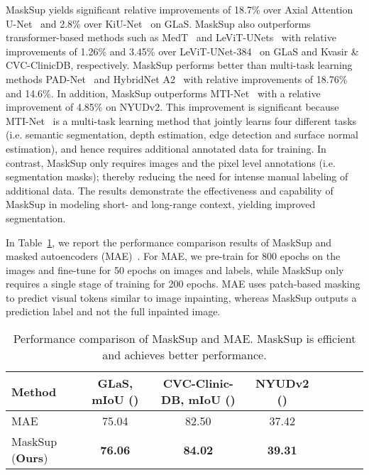 \documentclass{bmvc2k}
\begin{document}
MaskSup yields significant relative improvements of 18.7\% over Axial Attention U-Net~\cite{wang2020axial} and 2.8\% over KiU-Net~\cite{valanarasu2021kiu} on GLaS. MaskSup also outperforms transformer-based methods such as MedT~\cite{valanarasu2021medical} and LeViT-UNets~\cite{xu2021levit} with relative improvements of 1.26\% and 3.45\% over LeViT-UNet-384~\cite{xu2021levit} on GLaS and Kvasir \& CVC-ClinicDB, respectively. MaskSup performs better than multi-task learning methods PAD-Net~\cite{xu2018pad} and HybridNet A2~\cite{lin2019depth} with relative improvements of 18.76\% and 14.6\%. In addition, MaskSup outperforms MTI-Net~\cite{vandenhende2020mti} with a relative improvement of 4.85\% on NYUDv2. This improvement is significant because MTI-Net~\cite{vandenhende2020mti} is a multi-task learning method that jointly learns four different tasks (i.e. semantic segmentation, depth estimation, edge detection and surface normal estimation), and hence requires additional annotated data for training. In contrast, MaskSup only requires images and the pixel level annotations (i.e. segmentation masks); thereby reducing the need for intense manual labeling of additional data. The results demonstrate the effectiveness and capability of MaskSup in modeling short- and long-range context, yielding improved segmentation.

In Table~\ref{Tab:mae}, we report the performance comparison results of MaskSup and masked autoencoders (MAE)~\cite{he2022masked}. For MAE, we pre-train for 800 epochs on the images and fine-tune for 50 epochs on images and labels, while MaskSup only requires a single stage of training for 200 epochs. MAE uses patch-based masking to predict visual tokens similar to image inpainting, whereas MaskSup outputs a prediction label and not the full inpainted image.
\begin{table}[!htb]
\caption{Performance comparison of MaskSup and MAE. MaskSup is efficient and achieves better performance.}
\medskip
\centering
\begin{tabular}{l*{7}{c}}
\toprule
\textbf{Method} & \textbf{GLaS, mIoU ()} & \textbf{CVC-Clinic-DB, mIoU ()} & \textbf{NYUDv2 ()} \\
\midrule
MAE~\cite{he2022masked} & 75.04 & 82.50 & 37.42 \\
MaskSup (\textbf{Ours}) & \textbf{76.06} & \textbf{84.02} & \textbf{39.31} \\
\bottomrule
\end{tabular}
\label{Tab:mae}
\end{table}
\end{document}
